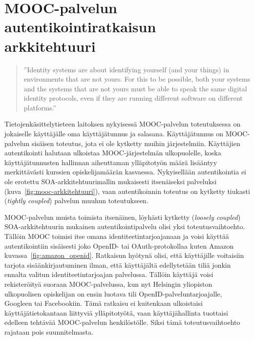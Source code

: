 \documentclass[finnish,gradu]{tktltiki}
\begin{document}
\section{MOOC-palvelun autentikointiratkaisun arkkitehtuuri} %
\label{sec:mooc_palvelun_autentikointiratkaisun_arkkitehtuuri}

  \begin{quote}
    ''Identity systems are about identifying yourself (and your things) in environments that are not yours.
    For this to be possible, both your systems and the systems that are not yours
    must be able to speak the same digital identity protocols,
    even if they are running different software on different platforms.''~\cite{cameron_id_arch_2006}
  \end{quote}

  Tietojenkäsittelytieteen laitoksen nykyisessä MOOC-palvelun toteutuksessa on jokaiselle käyttäjälle oma käyttäjätunnus ja salasana. Käyttäjätunnus on MOOC-palvelun sisäisen toteutus, jota ei ole kytketty muihin järjestelmiin. Käyttäjien autentikointi halutaan ulkoistaa MOOC-järjestelmän ulkopuolelle, koska käyttäjätunnusten hallinnan aiheuttaman ylläpitotyön määrä lisääntyy merkittävästi kurssien opiskelijamäärän kasvaessa. Nykyisellään autentikointia ei ole erotettu SOA-arkkitehtuurimallin mukaisesti itsenäiseksi palveluksi (kuva~\ref{fig:mooc-arkkitehtuuri}), vaan autentikoinnin toteutus on kytketty tiukasti (\emph{tightly coupled}) palvelun muuhun toteutukseen.

  MOOC-palvelun muista toimista itsenäinen, löyhästi kytketty (\emph{loosely coupled}) SOA-arkkitehtuurin mukainen autentikointipalvelu olisi yksi toteutusvaihtoehto. Tällöin MOOC toimisi itse omana identiteetintarjoajanaan ja voisi käyttää autentikointiin sisäisesti joko OpenID- tai OAuth-protokollaa kuten Amazon kuvassa~\ref{fig:amazon_openid}. Ratkaisun hyötynä olisi, että käyttäjille voitaisiin tarjota sisäänkirjautuminen ilman, että käyttäjältä edellytetään tiliä jonkin ennalta valitun identiteetintarjoajan palvelussa. Tällöin käyttäjä voisi rekisteröityä suoraan MOOC-palvelussa, kun nyt Helsingin yliopiston ulkopuolisen opiskelijan on ensin luotava tili OpenID-palveluntarjoajalle, Googleen tai Facebookiin. Tämä ratkaisu ei kuitenkaan ulkoistaisi käyttäjätietokantaan liittyviä ylläpitotyötä, vaan käyttäjähallinta tuottaisi edelleen tehtävää MOOC-palvelun henkilöstölle. Siksi tämä toteutusvaihtoehto rajataan pois suunnitelmasta.
\end{document}
